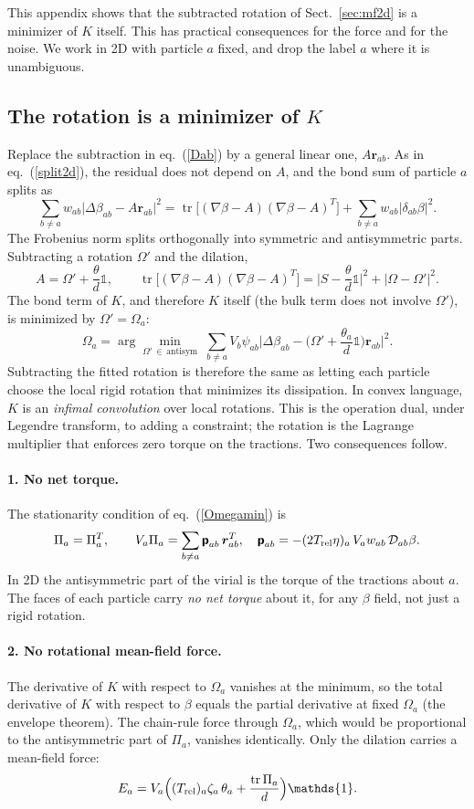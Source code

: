 \documentclass[11pt,aps,preprint,nofootinbib,superscriptaddress,tightenlines]{revtex4-2}
\def\st{\begin{equation}}
\def\stp{\end{equation}}
\def\Eq#1{eq.~(\ref{#1})}
\def\Sect#1{Sect.~\ref{#1}}
\providecommand{\tr}{\operatorname{tr}}
\newcommand{\one}{\mathds{1}}
\newcommand{\pf}{\bm{\mathsf p}}
\let\oldparagraph\paragraph
\renewcommand{\paragraph}{\par\bigskip\oldparagraph}
\begin{document}
This appendix shows that the subtracted rotation of \Sect{sec:mf2d} is a
minimizer of $K$ itself.  This has practical consequences for the force and for
the noise.  We work in 2D with particle $a$ fixed, and drop the label $a$ where
it is unambiguous.

\subsection{The rotation is a minimizer of $K$}

Replace the subtraction in \Eq{Dab} by a general linear one, $A\bm r_{ab}$.  As
in \Eq{split2d}, the residual does not depend on $A$, and the bond sum of
particle $a$ splits as
\st
\sum_{b\neq a}w_{ab}\big|\Delta\beta_{ab}-A\bm r_{ab}\big|^2
=\tr\big[(\nabla\beta-A)(\nabla\beta-A)^T\big]+\sum_{b\neq a}w_{ab}|\delta_{ab}\beta|^2 .
\label{genid}
\stp
The Frobenius norm splits orthogonally into symmetric and antisymmetric parts.
Subtracting a rotation $\Omega'$ and the dilation,
\st
A=\Omega'+\frac{\theta}{d}\one,\qquad
\tr\big[(\nabla\beta-A)(\nabla\beta-A)^T\big]
=\Big|S-\frac{\theta}{d}\one\Big|^2+\big|\Omega-\Omega'\big|^2 .
\stp
The bond term of $K$, and therefore $K$ itself (the bulk
term does not involve $\Omega'$), is minimized by $\Omega'=\Omega_a$:
\st
\boxed{\;\Omega_a=\arg\min_{\Omega'\,\in\,\text{antisym}}\;
\sum_{b\neq a}V_b\psi_{ab}\Big|\Delta\beta_{ab}-\Big(\Omega'+\frac{\theta_a}{d}\one\Big)\bm r_{ab}\Big|^2 .\;}
\label{Omegamin}
\stp
Subtracting the fitted rotation is therefore the same as letting each particle
choose the local rigid rotation that minimizes its dissipation.  In convex
language, $K$ is an \emph{infimal convolution} over local rotations.
This is the operation dual, under Legendre transform, to adding a constraint;
the rotation is the Lagrange multiplier that enforces zero torque on the
tractions.  Two
consequences follow.

\paragraph{1. No net torque.}  The stationarity condition of \Eq{Omegamin} is
\st
\Pi_a=\Pi_a^T,\qquad
V_a\Pi_a=\sum_{b\neq a}\pf_{ab}\,\bm r_{ab}^T,\quad
\pf_{ab}=-(2T_{\rm rel}\eta)_a\,V_aw_{ab}\,\mathcal D_{ab}\beta.
\stp
In 2D the antisymmetric part of the virial is the torque of the tractions about
$a$.  The faces of each particle carry \emph{no net
torque} about it, for any $\beta$ field, not just a rigid rotation.

\paragraph{2. No rotational mean-field force.}  The derivative of $K$ with
respect to $\Omega_a$ vanishes at the minimum, so the total derivative of $K$
with respect to $\beta$ equals the partial derivative at fixed $\Omega_a$ (the
envelope theorem).  The chain-rule force through $\Omega_a$, which
would be proportional to the antisymmetric part of $\Pi_a$, vanishes identically.  Only
the dilation carries a mean-field force:
\st
E_a=V_a\Big((T_{\rm rel})_a\zeta_a\,\theta_a+\frac{\tr\Pi_a}{d}\Big)\one .
\stp
\end{document}
